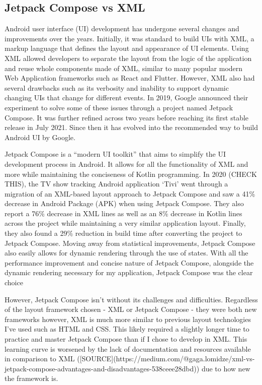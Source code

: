 \documentclass{l4proj}
\begin{document}
\subsection{Jetpack Compose vs XML}

Android user interface (UI) development has undergone several changes and improvements over the years. Initially, it was standard to build UIs with XML, a markup language that defines the layout and appearance of UI elements. Using XML allowed developers to separate the layout from the logic of the application and reuse whole components made of XML, similar to many popular modern Web Application frameworks such as React and Flutter. However, XML also had several drawbacks such as its verbosity and inability to support dynamic changing UIs that change for different events. In 2019, Google announced their experiment to solve some of these issues through a project named Jetpack Compose.  It was further refined across two years before reaching its first stable release in July 2021. Since then it has evolved into the recommended way to build Android UI by Google.

Jetpack Compose is a “modern UI toolkit” that aims to simplify the UI development process in Android. It allows for all the functionality of XML and more while maintaining the conciseness of Kotlin programming. In 2020 (CHECK THIS), the TV show tracking Android application ‘Tivi’ went through a migration of an XML-based layout approach to Jetpack Compose and saw a 41\% decrease in Android Package (APK) when using Jetpack Compose. They also report a 76\% decrease in XML lines as well as an 8\% decrease in Kotlin lines across the project while maintaining a very similar application layout. Finally, they also found a 29\% reduction in build time after converting the project to Jetpack Compose. Moving away from statistical improvements, Jetpack Compose also easily allows for dynamic rendering through the use of states. With all the performance improvement and concise nature of Jetpack Compose, alongside the dynamic rendering necessary for my application, Jetpack Compose was the clear choice

However, Jetpack Compose isn’t without its challenges and difficulties. Regardless of the layout framework chosen - XML or Jetpack Compose - they were both new frameworks however, XML is much more similar to previous layout technologies I’ve used such as HTML and CSS. This likely required a slightly longer time to practice and master Jetpack Compose than if I chose to develop in XML. This learning curve is worsened by the lack of documentation and resources available in comparison to XML ([SOURCE](https://medium.com/@gaga.lomidze/xml-vs-jetpack-compose-advantages-and-disadvantages-538ceee28dbd)) due to how new the framework is.
\end{document}
